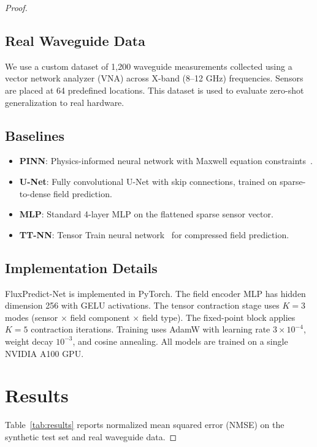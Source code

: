 \documentclass[11pt]{article}
\begin{document}
\begin{proof}
\subsection{Real Waveguide Data}

We use a custom dataset of 1,200 waveguide measurements collected using a vector network analyzer (VNA) across X-band (8--12 GHz) frequencies. Sensors are placed at 64 predefined locations. This dataset is used to evaluate zero-shot generalization to real hardware.

\subsection{Baselines}

\begin{itemize}
    \item \textbf{PINN}: Physics-informed neural network with Maxwell equation constraints~\cite{raissi2019physics}.
    \item \textbf{U-Net}: Fully convolutional U-Net with skip connections, trained on sparse-to-dense field prediction.
    \item \textbf{MLP}: Standard 4-layer MLP on the flattened sparse sensor vector.
    \item \textbf{TT-NN}: Tensor Train neural network~\cite{novikov2015tensorizing} for compressed field prediction.
\end{itemize}

\subsection{Implementation Details}

FluxPredict-Net is implemented in PyTorch. The field encoder MLP has hidden dimension 256 with GELU activations. The tensor contraction stage uses $K=3$ modes (sensor $\times$ field component $\times$ field type). The fixed-point block applies $K=5$ contraction iterations. Training uses AdamW with learning rate $3 \times 10^{-4}$, weight decay $10^{-3}$, and cosine annealing. All models are trained on a single NVIDIA A100 GPU.

\section{Results}

Table~\ref{tab:results} reports normalized mean squared error (NMSE) on the synthetic test set and real waveguide data.


\end{proof}
\end{document}
